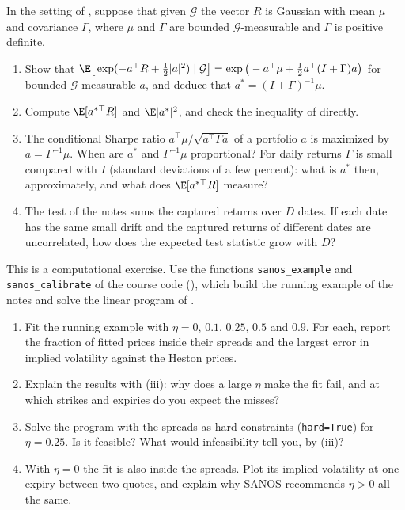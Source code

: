 \begin{exercise}\label{ex:afs-gaussian-test}
\medium In the setting of , suppose that given $\mathcal G$ the vector $R$ is Gaussian with mean $\mu$ and
covariance $\Gamma$, where $\mu$ and $\Gamma$ are bounded $\mathcal G$-measurable and $\Gamma$ is positive definite.
\begin{enumerate}[label=(\alph*)]
  \item Show that $\E\big[\exp(-a^\top R+\frac12|a|^2)\mid\mathcal G\big]=\exp\big(-a^\top\mu+\frac12a^\top(I+\Gamma)a\big)$ for bounded
    $\mathcal G$-measurable $a$, and deduce that $a^*=(I+\Gamma)^{-1}\mu$.
  \item Compute $\E[a^{*\top}R]$ and $\E|a^*|^2$, and check the inequality of  directly.
  \item The conditional Sharpe ratio $a^\top\mu/\sqrt{a^\top\Gamma a}$ of a portfolio $a$ is maximized by $a=\Gamma^{-1}\mu$. When are
    $a^*$ and $\Gamma^{-1}\mu$ proportional? For daily returns $\Gamma$ is small compared with $I$ (standard deviations of a few
    percent): what is $a^*$ then, approximately, and what does $\E[a^{*\top}R]$ measure?
  \item The test of the notes sums the captured returns over $D$ dates. If each date has the same small drift and the
    captured returns of different dates are uncorrelated, how does the expected test statistic grow with $D$?
\end{enumerate}
\end{exercise}

\begin{exercise}\label{ex:afs-sanos-lp}
\medium This is a computational exercise. Use the functions \texttt{sanos\_example} and \texttt{sanos\_calibrate} of the course code
(), which build the running example of the notes and solve the linear program of
.
\begin{enumerate}[label=(\alph*)]
  \item Fit the running example with $\eta=0$, $0.1$, $0.25$, $0.5$ and $0.9$. For each, report the fraction of fitted prices inside
    their spreads and the largest error in implied volatility against the Heston prices.
  \item Explain the results with (iii): why does a large $\eta$ make the fit fail, and at which strikes and
    expiries do you expect the misses?
  \item Solve the program with the spreads as hard constraints (\texttt{hard=True}) for $\eta=0.25$. Is it feasible? What would
    infeasibility tell you, by (iii)?
  \item With $\eta=0$ the fit is also inside the spreads. Plot its implied volatility at one expiry between two quotes, and explain why
    SANOS recommends $\eta>0$ all the same.
\end{enumerate}
\end{exercise}
